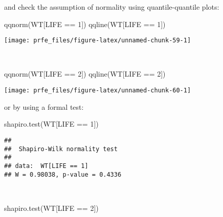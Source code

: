 \documentclass[
  12pt,
  a4paper]{book}
\newenvironment{Shaded}{\begin{snugshade}}{\end{snugshade}}
\newcommand{\DecValTok}[1]{\textcolor[rgb]{0.00,0.00,0.81}{#1}}
\newcommand{\FunctionTok}[1]{\textcolor[rgb]{0.00,0.00,0.00}{#1}}
\newcommand{\NormalTok}[1]{#1}
\newcommand{\SpecialCharTok}[1]{\textcolor[rgb]{0.00,0.00,0.00}{#1}}
\begin{document}
\newpage

and check the assumption of normality using quantile-quantile plots:

\begin{Shaded}
\begin{Highlighting}[]
\FunctionTok{qqnorm}\NormalTok{(WT[LIFE }\SpecialCharTok{==} \DecValTok{1}\NormalTok{])}
\FunctionTok{qqline}\NormalTok{(WT[LIFE }\SpecialCharTok{==} \DecValTok{1}\NormalTok{])}
\end{Highlighting}
\end{Shaded}

\begin{center}\texttt{[image: prfe\_files/figure-latex/unnamed-chunk-59-1]} \end{center}

~

\begin{Shaded}
\begin{Highlighting}[]
\FunctionTok{qqnorm}\NormalTok{(WT[LIFE }\SpecialCharTok{==} \DecValTok{2}\NormalTok{])}
\FunctionTok{qqline}\NormalTok{(WT[LIFE }\SpecialCharTok{==} \DecValTok{2}\NormalTok{])}
\end{Highlighting}
\end{Shaded}

\begin{center}\texttt{[image: prfe\_files/figure-latex/unnamed-chunk-60-1]} \end{center}

\newpage

or by using a formal test:

\begin{Shaded}
\begin{Highlighting}[]
\FunctionTok{shapiro.test}\NormalTok{(WT[LIFE }\SpecialCharTok{==} \DecValTok{1}\NormalTok{])}
\end{Highlighting}
\end{Shaded}

\begin{verbatim}
## 
##  Shapiro-Wilk normality test
## 
## data:  WT[LIFE == 1]
## W = 0.98038, p-value = 0.4336
\end{verbatim}

~

\begin{Shaded}
\begin{Highlighting}[]
\FunctionTok{shapiro.test}\NormalTok{(WT[LIFE }\SpecialCharTok{==} \DecValTok{2}\NormalTok{])}
\end{Highlighting}
\end{Shaded}
\end{document}
